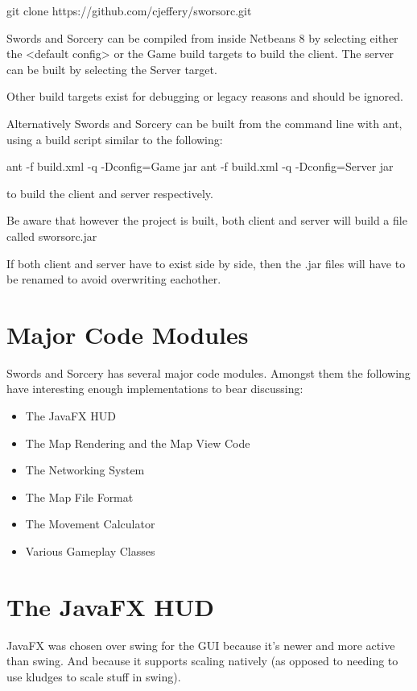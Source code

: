 \documentclass[12pt,a4paper]{article}
\begin{document}
    git clone https://github.com/cjeffery/sworsorc.git

Swords and Sorcery can be compiled from inside Netbeans 8 by selecting either
the <default config> or the Game build targets to build the client. The server
can be built by selecting the Server target.

Other build targets exist for debugging or legacy reasons and should be ignored.

Alternatively Swords and Sorcery can be built from the command line with ant,
using a build script similar to the following:

    ant -f build.xml -q -Dconfig=Game jar
    ant -f build.xml -q -Dconfig=Server jar

to build the client and server respectively.

Be aware that however the project is built, 
both client and server will build a file called sworsorc.jar

If both client and server have to exist side by side,
then the .jar files will have to be renamed to avoid overwriting eachother.

\section{Major Code Modules}
Swords and Sorcery has several major code modules. Amongst them the following
have interesting enough implementations to bear discussing:

\begin{itemize}
	\item The JavaFX HUD	
	\item The Map Rendering and the Map View Code
	\item The Networking System
	\item The Map File Format
	\item The Movement Calculator
    \item Various Gameplay Classes
\end{itemize}

\section{The JavaFX HUD}
JavaFX was chosen over swing for the GUI because it's newer and more active
than swing. And because it supports scaling natively (as opposed to needing to
use kludges to scale stuff in swing).
\end{document}

